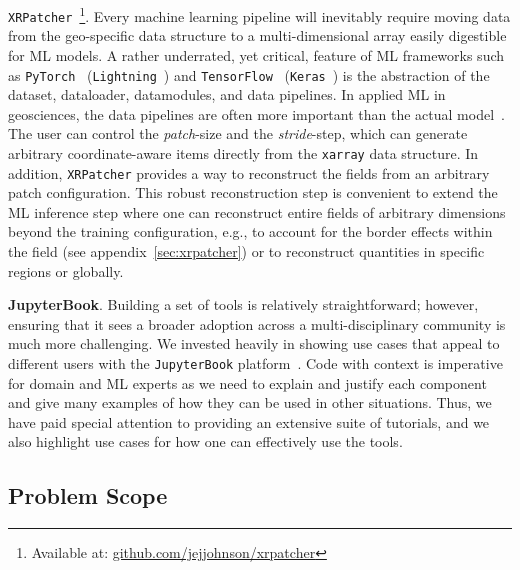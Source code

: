 \texttt{XRPatcher}~\footnote{Available at: \href{https://github.com/jejjohnson/xrpatcher/}{github.com/jejjohnson/xrpatcher}}. 
Every machine learning pipeline will inevitably require moving data from the geo-specific data structure to a multi-dimensional array easily digestible for ML models. 
A rather underrated, yet critical, feature of ML frameworks such as \texttt{PyTorch}~\cite{PYTORCH} (\texttt{Lightning}~\cite{LIGHTNING}) and \texttt{TensorFlow}~\cite{TENSORFLOW} (\texttt{Keras}~\cite{KERAS}) is the abstraction of the dataset, dataloader, datamodules, and data pipelines. 
In applied ML in geosciences, the data pipelines are often more important than the actual model~\cite{DATA4ML}. 
The user can control the \textit{patch}-size and the \textit{stride}-step, which can generate arbitrary coordinate-aware items directly from the \texttt{xarray} data structure. 
In addition, \texttt{XRPatcher} provides a way to reconstruct the fields from an arbitrary patch configuration.
This robust reconstruction step is convenient to extend the ML inference step where one can reconstruct entire fields of arbitrary dimensions beyond the training configuration, e.g., to account for the border effects within the field (see appendix~\ref{sec:xrpatcher}) or to reconstruct quantities in specific regions or globally. 

\textbf{JupyterBook}.
Building a set of tools is relatively straightforward; however, ensuring that it sees a broader adoption across a multi-disciplinary community is much more challenging. 
We invested heavily in showing use cases that appeal to different users with the \texttt{JupyterBook} platform~\cite{JupyterBook}. 
Code with context is imperative for domain and ML experts as we need to explain and justify each component and give many examples of how they can be used in other situations. 
Thus, we have paid special attention to providing an extensive suite of tutorials, and we also highlight use cases for how one can effectively use the tools. 


\subsection{Problem Scope} \label{sec:problem_scope}

